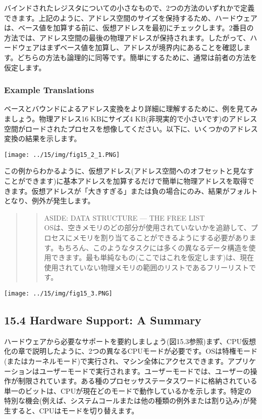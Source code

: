 バインドされたレジスタについての小さなもので、2つの方法のいずれかで定義できます。上記のように、アドレス空間のサイズを保持するため、ハードウェアは、ベース値を加算する前に、仮想アドレスを最初にチェックします。2番目の方法では、アドレス空間の最後の物理アドレスが保持されます。したがって、ハードウェアはまずベース値を加算し、アドレスが境界内にあることを確認します。どちらの方法も論理的に同等です。簡単にするために、通常は前者の方法を仮定します。

\hypertarget{example-translations}{%
\subsubsection*{Example Translations}\label{example-translations}}

ベースとバウンドによるアドレス変換をより詳細に理解するために、例を見てみましょう。物理アドレス16
KBにサイズ4
KB(非現実的で小さいです)のアドレス空間がロードされたプロセスを想像してください。以下に、いくつかのアドレス変換の結果を示します。

\texttt{[image: ../15/img/fig15\_2\_1.PNG]}

この例からわかるように、仮想アドレス(アドレス空間へのオフセットと見なすことができます)に基本アドレスを加算するだけで簡単に物理アドレスを取得できます。仮想アドレスが「大きすぎる」または負の場合にのみ、結果がフォルトとなり、例外が発生します。

\begin{quote}
\begin{quote}
ASIDE: DATA STRUCTURE --- THE FREE LIST\\
OSは、空きメモリのどの部分が使用されていないかを追跡して、プロセスにメモリを割り当てることができるようにする必要があります。もちろん、このようなタスクには多くの異なるデータ構造を使用できます。最も単純なもの(ここではこれを仮定します)は、現在使用されていない物理メモリの範囲のリストであるフリーリストです。
\end{quote}
\end{quote}

\texttt{[image: ../15/img/fig15\_3.PNG]}

\hypertarget{hardware-support-a-summary}{%
\subsection*{15.4 Hardware Support: A
Summary}\label{hardware-support-a-summary}}

ハードウェアから必要なサポートを要約しましょう(図15.3参照)まず、CPU仮想化の章で説明したように、2つの異なるCPUモードが必要です。OSは特権モード(またはカーネルモード)で実行され、マシン全体にアクセスできます。アプリケーションはユーザーモードで実行されます。ユーザーモードでは、ユーザーの操作が制限されています。ある種のプロセッサステータスワードに格納されている単一のビットは、CPUが現在どのモードで動作しているかを示します。特定の特別な機会(例えば、システムコールまたは他の種類の例外または割り込み)が発生すると、CPUはモードを切り替えます。

